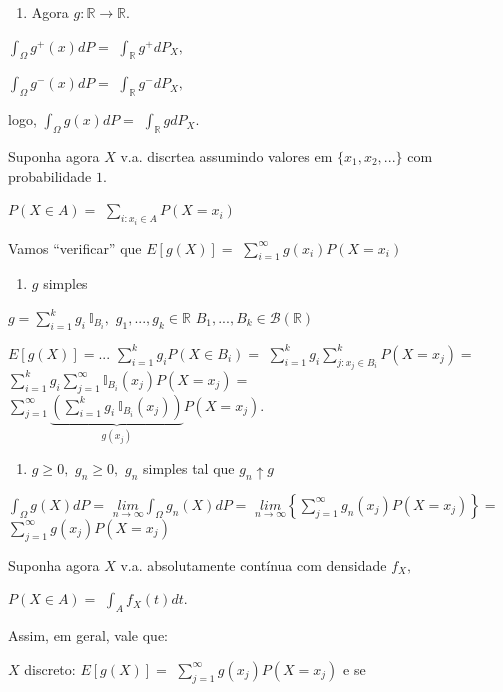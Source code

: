 \documentclass[
]{book}
\providecommand{\tightlist}{%
  \setlength{\itemsep}{0pt}\setlength{\parskip}{0pt}}
\begin{document}
\begin{enumerate}
\def\labelenumi{(\arabic{enumi})}
\setcounter{enumi}{2}
\tightlist
\item
  Agora \(g: \mathbb{R} \longrightarrow \mathbb{R}.\)
\end{enumerate}

\(\int_\Omega g^+(x)dP=\) \(\int_{\mathbb{R}}g^+dP_X,\)

\(\int_\Omega g^-(x)dP=\) \(\int_{\mathbb{R}}g^-dP_X,\)

logo, \(\int_\Omega g(x)dP=\) \(\int_{\mathbb{R}}gdP_X.\)

Suponha agora \(X\) v.a. discrtea assumindo valores em \(\{x_1,x_2,...\}\) com probabilidade \(1\).

\(P(X \in A) =\) \(\underset{i:x_i\in A}{\sum}P(X=x_i)\)

Vamos ``verificar'' que \(E[g(X)]=\) \(\sum_{i=1}^\infty g(x_i)P(X=x_i)\)

\begin{enumerate}
\def\labelenumi{(\arabic{enumi})}
\tightlist
\item
  \(g\) simples
\end{enumerate}

\(g = \sum_{i=1}^kg_i~\mathbb{I}_{B_i},\) \(g_1,...,g_k \in \mathbb{R}\) \(B_1,...,B_k \in \mathcal{B}(\mathbb{R})\)

\(E[g(X)] =...\) \(\sum_{i=1}^k g_i P(X \in B_i)=\) \(\sum_{i=1}^k g_i \sum_{j:x_j \in B_i}^k P(X = x_j)=\) \(\sum_{i=1}^k g_i \sum_{j=1}^\infty \mathbb{I}_{B_i}(x_j)P(X=x_j)=\) \(\sum_{j=1}^\infty \underbrace{\left(\sum_{i=1}^k g_i ~\mathbb{I}_{B_i}(x_j)\right)}_{g(x_j)}P(X = x_j).\)

\begin{enumerate}
\def\labelenumi{(\arabic{enumi})}
\setcounter{enumi}{1}
\tightlist
\item
  \(g\geq 0,\) \(g_n\geq0,\) \(g_n\) simples tal que \(g_n \uparrow g\)
\end{enumerate}

\(\int_\Omega g(X)dP=\) \(\underset{n\rightarrow\infty}{lim}\int_\Omega g_n(X)dP=\) \(\underset{n\rightarrow\infty}{lim}\left\{\sum_{j=1}^\infty g_n(x_j)P(X=x_j)\right\}=\) \(\sum_{j=1}^\infty g(x_j)P(X = x_j)\)

Suponha agora \(X\) v.a. absolutamente contínua com densidade \(f_X,\)

\(P(X\in A)=\) \(\int_Af_X(t)dt.\)

Assim, em geral, vale que:

\(X\) discreto: \(E[g(X)] =\) \(\sum_{j=1}^\infty g(x_j)P(X=x_j)\) e se
\end{document}
